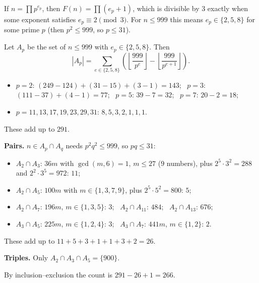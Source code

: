 If $n=\prod p^{e_p}$, then $F(n)=\prod(e_p+1)$, which is divisible by $3$ exactly when some exponent satisfies $e_p\equiv2\pmod3$. For $n\le999$ this means $e_p\in\{2,5,8\}$ for some prime $p$ (then $p^2\le999$, so $p\le31$).

Let $A_p$ be the set of $n\le999$ with $e_p\in\{2,5,8\}$. Then
\[
|A_p|=\sum_{e\in\{2,5,8\}}\left(\left\lfloor\dfrac{999}{p^e}\right\rfloor-\left\lfloor\dfrac{999}{p^{e+1}}\right\rfloor\right).
\]
\begin{itemize}
\item $p=2$: $(249-124)+(31-15)+(3-1)=143$; \ $p=3$: $(111-37)+(4-1)=77$; \ $p=5$: $39-7=32$; \ $p=7$: $20-2=18$;
\item $p=11,13,17,19,23,29,31$: $8,5,3,2,1,1,1$.
\end{itemize}
These add up to $291$.

\textbf{Pairs.} $n\in A_p\cap A_q$ needs $p^2q^2\le999$, so $pq\le31$:
\begin{itemize}
\item $A_2\cap A_3$: $36m$ with $\gcd(m,6)=1$, $m\le27$ ($9$ numbers), plus $2^5\cdot3^2=288$ and $2^2\cdot3^5=972$: $11$;
\item $A_2\cap A_5$: $100m$ with $m\in\{1,3,7,9\}$, plus $2^5\cdot5^2=800$: $5$;
\item $A_2\cap A_7$: $196m$, $m\in\{1,3,5\}$: $3$; \ $A_2\cap A_{11}$: $484$; \ $A_2\cap A_{13}$: $676$;
\item $A_3\cap A_5$: $225m$, $m\in\{1,2,4\}$: $3$; \ $A_3\cap A_7$: $441m$, $m\in\{1,2\}$: $2$.
\end{itemize}
These add up to $11+5+3+1+1+3+2=26$.

\textbf{Triples.} Only $A_2\cap A_3\cap A_5=\{900\}$.

By inclusion--exclusion the count is $291-26+1=\boxed{266}$.
